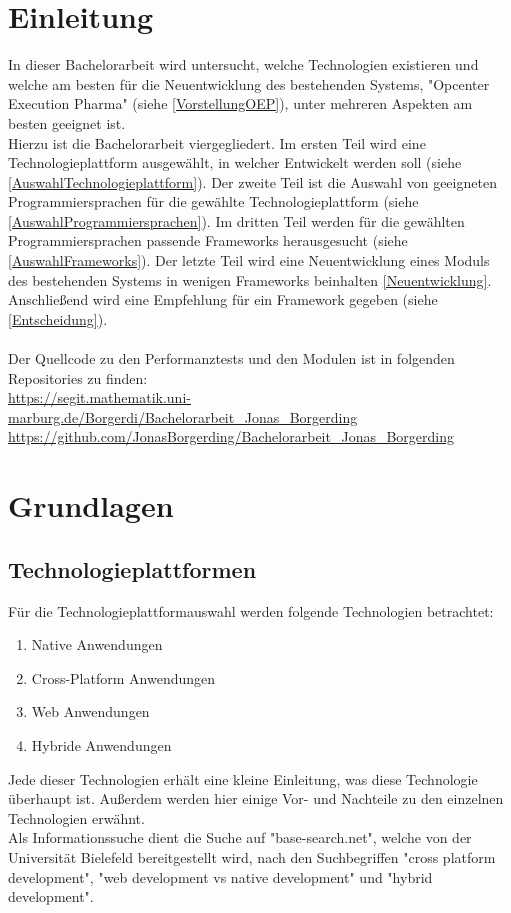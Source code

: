 \documentclass[ngerman]{article}
\begin{document}
    \section{Einleitung}
    \label{Einleitung}
    In dieser Bachelorarbeit wird untersucht, welche Technologien existieren und welche am besten für die Neuentwicklung des bestehenden Systems, "Opcenter Execution Pharma" (siehe \ref{VorstellungOEP}), unter mehreren Aspekten am besten geeignet ist.\\
    Hierzu ist die Bachelorarbeit viergegliedert. Im ersten Teil wird eine Technologieplattform ausgewählt, in welcher Entwickelt werden soll (siehe \ref{AuswahlTechnologieplattform}). Der zweite Teil ist die Auswahl von geeigneten Programmiersprachen für die gewählte Technologieplattform (siehe \ref{AuswahlProgrammiersprachen}). Im dritten Teil werden für die gewählten Programmiersprachen passende Frameworks herausgesucht (siehe \ref{AuswahlFrameworks}). Der letzte Teil wird eine Neuentwicklung eines Moduls des bestehenden Systems in wenigen Frameworks beinhalten \ref{Neuentwicklung}. Anschließend wird eine Empfehlung für ein Framework gegeben (siehe \ref{Entscheidung}).\\\\
    Der Quellcode zu den Performanztests und den Modulen ist in folgenden Repositories zu finden:\\
    \url{https://segit.mathematik.uni-marburg.de/Borgerdi/Bachelorarbeit_Jonas_Borgerding}\\
    \url{https://github.com/JonasBorgerding/Bachelorarbeit_Jonas_Borgerding}\\
    \newpage\noindent
    \section{Grundlagen}
    \label{Grundlagen}
    \subsection{Technologieplattformen}
    \label{GrundlagenTechnologiePlattformen}
    Für die Technologieplattformauswahl werden folgende Technologien betrachtet:
    \begin{enumerate}
        \item Native Anwendungen
        \item Cross-Platform Anwendungen
        \item Web Anwendungen
        \item Hybride Anwendungen
    \end{enumerate}
    Jede dieser Technologien erhält eine kleine Einleitung, was diese Technologie überhaupt ist. Außerdem werden hier einige Vor- und Nachteile zu den einzelnen Technologien erwähnt.\\
    Als Informationssuche dient die Suche auf "base-search.net", welche von der Universität Bielefeld bereitgestellt wird, nach den Suchbegriffen "cross platform development", "web development vs native development" und "hybrid development".
\end{document}
